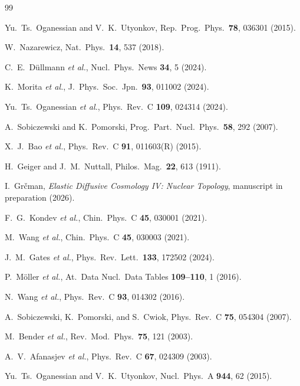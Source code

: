 \documentclass[12pt,a4paper,twocolumn]{revtex4-2}
\begin{document}
\begin{thebibliography}{99}

  Yu.~Ts.~Oganessian and V.~K.~Utyonkov,
  Rep.\ Prog.\ Phys.\ \textbf{78}, 036301 (2015).

  W.~Nazarewicz,
  Nat.\ Phys.\ \textbf{14}, 537 (2018).

  C.~E.~D\"ullmann \emph{et al.},
  Nucl.\ Phys.\ News \textbf{34}, 5 (2024).

  K.~Morita \emph{et al.},
  J.\ Phys.\ Soc.\ Jpn.\ \textbf{93}, 011002 (2024).

  Yu.~Ts.~Oganessian \emph{et al.},
  Phys.\ Rev.\ C \textbf{109}, 024314 (2024).

  A.~Sobiczewski and K.~Pomorski,
  Prog.\ Part.\ Nucl.\ Phys.\ \textbf{58}, 292 (2007).

  X.~J.~Bao \emph{et al.},
  Phys.\ Rev.\ C \textbf{91}, 011603(R) (2015).

  H.~Geiger and J.~M.~Nuttall,
  Philos.\ Mag.\ \textbf{22}, 613 (1911).

  I.~Gr\v{c}man,
  \emph{Elastic Diffusive Cosmology IV: Nuclear Topology},
  manuscript in preparation (2026).

  F.~G.~Kondev \emph{et al.},
  Chin.\ Phys.\ C \textbf{45}, 030001 (2021).

  M.~Wang \emph{et al.},
  Chin.\ Phys.\ C \textbf{45}, 030003 (2021).

  J.~M.~Gates \emph{et al.},
  Phys.\ Rev.\ Lett.\ \textbf{133}, 172502 (2024).

  P.~M\"oller \emph{et al.},
  At.\ Data Nucl.\ Data Tables \textbf{109--110}, 1 (2016).

  N.~Wang \emph{et al.},
  Phys.\ Rev.\ C \textbf{93}, 014302 (2016).

  A.~Sobiczewski, K.~Pomorski, and S.~Cwiok,
  Phys.\ Rev.\ C \textbf{75}, 054304 (2007).

  M.~Bender \emph{et al.},
  Rev.\ Mod.\ Phys.\ \textbf{75}, 121 (2003).

  A.~V.~Afanasjev \emph{et al.},
  Phys.\ Rev.\ C \textbf{67}, 024309 (2003).

  Yu.~Ts.~Oganessian and V.~K.~Utyonkov,
  Nucl.\ Phys.\ A \textbf{944}, 62 (2015).

\end{thebibliography}
\end{document}
